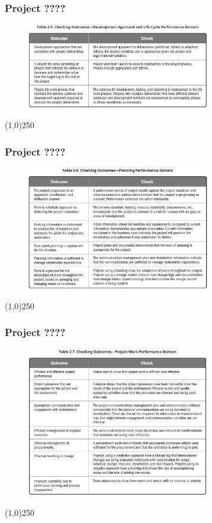 \begin{frame}
\frametitle{Project ????}
 \begin{figure}
    \centering
        \includegraphics[width = 8cm]{../images/guide/Table2-5.jpg}
    \label{guideTable:2-5}
 \end{figure}
\end{frame}
\begin{center}\line(1,0){250}\end{center}

\begin{frame}
\frametitle{Project ????}
 \begin{figure}
    \centering
        \includegraphics[width = 8cm]{../images/guide/Table2-6.jpg}
    \label{guideTable:2-6}
 \end{figure}
\end{frame}
\begin{center}\line(1,0){250}\end{center}

\begin{frame}
\frametitle{Project ????}
 \begin{figure}
    \centering
        \includegraphics[width = 8cm]{../images/guide/Table2-7.jpg}
    \label{guideTable:2-7}
 \end{figure}
\end{frame}
\begin{center}\line(1,0){250}\end{center}

